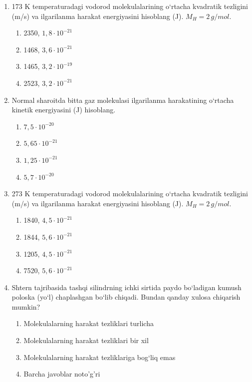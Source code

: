 \begin{enumerate}
\item 173 K temperaturadagi vodorod molekulalarining o‘rtacha kvadratik tezligini (m/s) va ilgarilanma harakat energiyasini hisoblang (J). $M_H = 2 \, g/mol$.
\begin{enumerate}[label=\Alph*)]
\item 2350, $1,8 \cdot 10^{-21}$
\item 1468, $3,6 \cdot 10^{-21}$
\item 1465, $3,2 \cdot 10^{-19}$
\item 2523, $3,2 \cdot 10^{-21}$
\end{enumerate}

\item Normal sharoitda bitta gaz molekulasi ilgarilanma harakatining o‘rtacha kinetik energiyasini (J) hisoblang.
\begin{enumerate}[label=\Alph*)]
\item $7,5 \cdot 10^{-20}$
\item $5,65 \cdot 10^{-21}$
\item $1,25 \cdot 10^{-21}$
\item $5,7 \cdot 10^{-20}$
\end{enumerate}

\item 273 K temperaturadagi vodorod molekulalarining o‘rtacha kvadratik tezligini (m/s) va ilgarilanma harakat energiyasini hisoblang (J). $M_H = 2 \, g/mol$.
\begin{enumerate}[label=\Alph*)]
\item 1840, $4,5 \cdot 10^{-21}$
\item 1844, $5,6 \cdot 10^{-21}$
\item 1205, $4,5 \cdot 10^{-21}$
\item 7520, $5,6 \cdot 10^{-21}$
\end{enumerate}

\item Shtern tajribasida tashqi silindrning ichki sirtida paydo bo‘ladigan kumush poloska (yo‘l) chaplashgan bo‘lib chiqadi. Bundan qanday xulosa chiqarish mumkin?
\begin{enumerate}[label=\Alph*)]
\item Molekulalarning harakat tezliklari turlicha
\item Molekulalarning harakat tezliklari bir xil
\item Molekulalarning harakat tezliklariga bog‘liq emas
\item Barcha javoblar noto'g'ri
\end{enumerate}


\end{enumerate}
